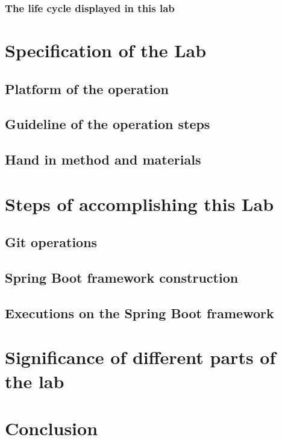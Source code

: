 \documentclass[a4paper]{report}
\begin{document}
\subsection{The life cycle displayed in this lab}

\chapter{Specification of the Lab}
\section{Platform of the operation}
\section{Guideline of the operation steps}
\section{Hand in method and materials}
\chapter{Steps of accomplishing this Lab}
\section{Git operations}
\section{Spring Boot framework construction}
\section{Executions on the Spring Boot framework}
\chapter{Significance of different parts of the lab}
\chapter{Conclusion}
\end{document}
